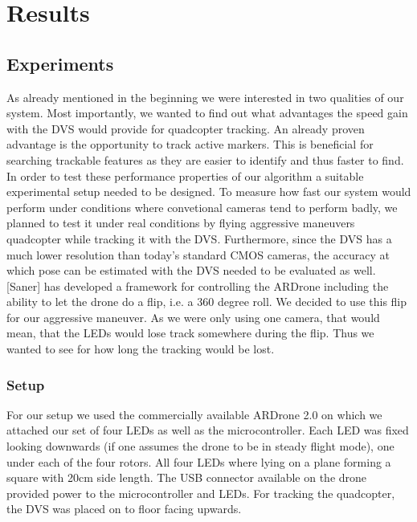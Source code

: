 \chapter{Results}\label{sec:results}

\section{Experiments}\label{sec:experiments}

As already mentioned in the beginning we were interested in two qualities of our system. Most importantly, we wanted to find out what advantages the speed gain with the DVS would provide for quadcopter tracking. An already proven advantage is the opportunity to track active markers.  This is beneficial for searching trackable features as they are easier to identify and thus faster to find. In order to test these performance properties of our algorithm a suitable experimental setup needed to be designed. To measure how fast our system would perform under conditions where convetional cameras tend to perform badly, we planned to test it under real conditions by flying aggressive maneuvers quadcopter while tracking it with the DVS. Furthermore, since the DVS has a much lower resolution than today’s standard CMOS cameras, the accuracy at which pose can be estimated with the DVS needed to be evaluated as well. [Saner] has developed a framework for controlling the ARDrone including the ability to let the drone do a flip, i.e. a 360 degree roll. We decided to use this flip for our aggressive maneuver. As we were only using one camera, that would mean, that the LEDs would lose track somewhere during the flip. Thus we wanted to see for how long the tracking would be lost.


\subsection{Setup}\label{sec:experimentalsetup}

For our setup we used the commercially available ARDrone 2.0 on which we attached our set of four LEDs as well as the microcontroller. Each LED was fixed looking downwards (if one assumes the drone to be in steady flight mode), one under each of the four rotors. All four LEDs where lying on a plane forming a square with 20cm side length. The USB connector available on the drone provided power to the microcontroller and LEDs. For tracking the quadcopter, the DVS was placed on to floor facing upwards.


